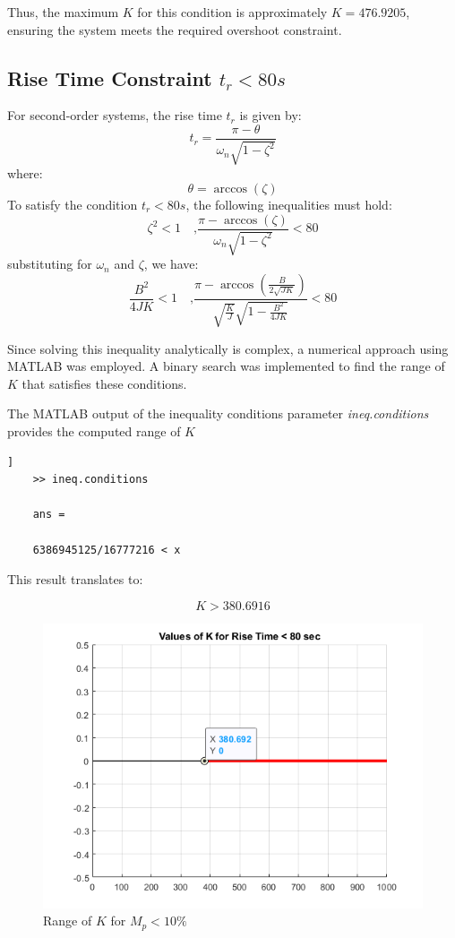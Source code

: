 \documentclass[a4paper, 12pt, english]{article}
\begin{document}
Thus, the maximum $K$ for this condition is approximately $ {K} = {476.9205} $, ensuring the system meets the required overshoot constraint.

\subsection{Rise Time Constraint {$ {t}_{r} < {80s} $}} \label{sec:rise time constraint}
\noindent
For second-order systems, the rise time $ {t}_{r} $ is given by:
\[ {{t}_{r}} = {\frac{{\pi} - {\theta}}{{{\omega}_{n}{\sqrt{{1} - {{\zeta}^{2}}}}}}} \]
where:
\[ {\theta} = {\arccos\left({\zeta}\right)} \]
To satisfy the condition $ {{t}_{r}} < {80s} $, the following inequalities must hold:
\[ {{\zeta}^{2}} < {1} \quad\mbox{,} {\frac{{\pi} - {\arccos\left({\zeta}\right)}}{{{\omega}_{n}{\sqrt{{1} - {{\zeta}^{2}}}}}}} < 80 \]
substituting for $ {{\omega}_{n}} $ and $\zeta$, we have:
\[ {\frac{{B}^{2}}{{4}{J}{K}}} < {1} \quad\mbox{,} {\frac{{\pi} - {\arccos\left({\frac{B}{{2}{\sqrt{{J}{K}}}}}\right)}}{{\sqrt{\frac{K}{J}}}{\sqrt{{1} - {\frac{{B}^{2}}{{4}{J}{K}}}}}}} < 80 \]

Since solving this inequality analytically is complex, a numerical approach using MATLAB was employed. A binary search was implemented to find the range of $K$ that satisfies these conditions.



The MATLAB output of the inequality conditions parameter \textit{ineq.conditions} provides the computed range of $K$

\begin{lstlisting}[style=commandstyle,caption=Command line output]]
    >> ineq.conditions
     
    ans =
     
    6386945125/16777216 < x
\end{lstlisting}

This result translates to:

\[ {K} > 380.6916 \]

\begin{figure}[H]
    \centering
    \includegraphics[width=0.7\linewidth]{report/images/KforTr80.png}
    \caption{Range of $K$ for $ {{M}_{p}} < {10\%} $}
    \label{fig:Rise time constraint}
\end{figure}
\end{document}
